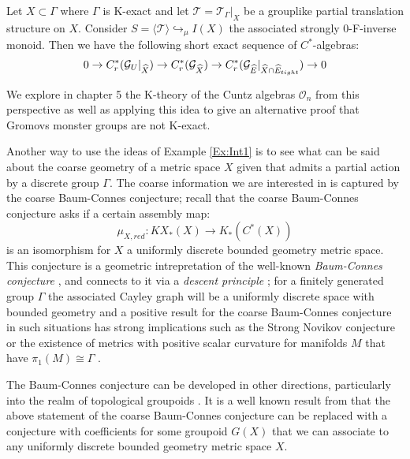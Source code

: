 \begin{thm}
Let $X \subset \Gamma$ where $\Gamma$ is K-exact and let $\mathcal{T}=\mathcal{T}_{\Gamma}|_{X}$ be a grouplike partial translation structure on $X$. Consider $S=\langle \mathcal{T} \rangle \hookrightarrow_{\mu} I(X)$ the associated strongly 0-F-inverse monoid. Then we have the following short exact sequence of $C^{*}$-algebras:
\begin{equation*}
0 \rightarrow C^{*}_{r}(\mathcal{G}_{U}|_{\widehat{X}}) \rightarrow C^{*}_{r}(\mathcal{G}_{\widehat{X}}) \rightarrow C^{*}_{r}(\mathcal{G}_{\widehat{E}}|_{\widehat{X}\cap\widehat{E}_{tight}}) \rightarrow 0
\end{equation*}
\end{thm}

We explore in chapter 5 the K-theory of the Cuntz algebras $\mathcal{O}_{n}$ from this perspective as well as applying this idea to give an alternative proof that Gromovs monster groups are not K-exact.

Another way to use the ideas of Example \ref{Ex:Int1} is to see what can be said about the coarse geometry of a metric space $X$ given that admits a partial action by a discrete group $\Gamma$. The coarse information we are interested in is captured by the coarse Baum-Connes conjecture; recall that the coarse Baum-Connes conjecture \cite{MR1388312} asks if a certain assembly map:
\begin{equation*}
\mu_{X,red}:KX_{*}(X) \longrightarrow K_{*}(C^{*}(X))
\end{equation*}
is an isomorphism for $X$ a uniformly discrete bounded geometry metric space. This conjecture is a geometric intrepretation of the well-known \textit{Baum-Connes conjecture} \cite{MR1292018}, and connects to it via a \textit{descent principle} \cite{MR1399087,MR1817560}; for a finitely generated group $\Gamma$ the associated Cayley graph will be a uniformly discrete space with bounded geometry and a positive result for the coarse Baum-Connes conjecture in such situations has strong implications such as the Strong Novikov conjecture \cite{MR866507} or the existence of metrics with positive scalar curvature for manifolds $M$ that have $\pi_{1}(M)\cong \Gamma$ \cite{MR1817560}.

The Baum-Connes conjecture can be developed in other directions, particularly into the realm of topological groupoids \cite{MR1798599}. It is a well known result from \cite{MR1905840} that the above statement of the coarse Baum-Connes conjecture can be replaced with a conjecture with coefficients for some groupoid $G(X)$ that we can associate to any uniformly discrete bounded geometry metric space $X$.

